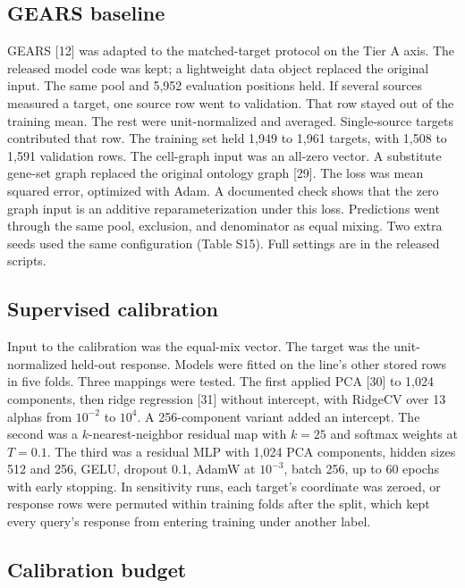 \documentclass[12pt]{article}
\begin{document}
\subsection*{GEARS baseline}

GEARS [12] was adapted to the matched-target protocol on the Tier A axis. The released model code was kept; a lightweight data object replaced the original input. The same pool and 5,952 evaluation positions held. If several sources measured a target, one source row went to validation. That row stayed out of the training mean. The rest were unit-normalized and averaged. Single-source targets contributed that row. The training set held 1,949 to 1,961 targets, with 1,508 to 1,591 validation rows. The cell-graph input was an all-zero vector. A substitute gene-set graph replaced the original ontology graph [29]. The loss was mean squared error, optimized with Adam. A documented check shows that the zero graph input is an additive reparameterization under this loss. Predictions went through the same pool, exclusion, and denominator as equal mixing. Two extra seeds used the same configuration (Table S15). Full settings are in the released scripts.

\subsection*{Supervised calibration}

Input to the calibration was the equal-mix vector. The target was the unit-normalized held-out response. Models were fitted on the line's other stored rows in five folds. Three mappings were tested. The first applied PCA [30] to 1,024 components, then ridge regression [31] without intercept, with RidgeCV over 13 alphas from $10^{-2}$ to $10^{4}$. A 256-component variant added an intercept. The second was a $k$-nearest-neighbor residual map with $k = 25$ and softmax weights at $T = 0.1$. The third was a residual MLP with 1,024 PCA components, hidden sizes 512 and 256, GELU, dropout 0.1, AdamW at $10^{-3}$, batch 256, up to 60 epochs with early stopping. In sensitivity runs, each target's coordinate was zeroed, or response rows were permuted within training folds after the split, which kept every query's response from entering training under another label.

\subsection*{Calibration budget}
\end{document}
